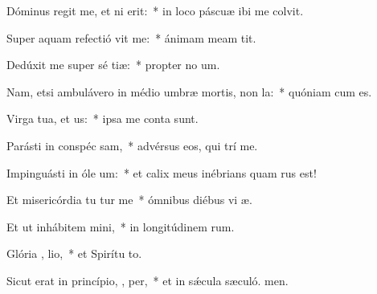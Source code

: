 \item Dóminus regit me, et ni  erit:~* in loco páscuæ ibi me colvit.
\item Super aquam refectió vit me:~* ánimam meam tit.
\item Dedúxit me super sé tiæ:~* propter no um.
\item Nam, etsi ambulávero in médio umbræ mortis, non  la:~* quóniam  cum es.
\item Virga tua, et  us:~* ipsa me conta sunt.
\item Parásti in conspéc  sam,~* advérsus eos, qui trí me.
\item Impinguásti in óle  um:~* et calix meus inébrians quam rus est!
\item Et misericórdia tu tur me~* ómnibus diébus vi æ.
\item Et ut inhábitem   mini,~* in longitúdinem rum.
\item Glória ,  lio,~* et Spirítu to.
\item Sicut erat in princípio,  ,  per,~* et in sǽcula sæculó. men.
